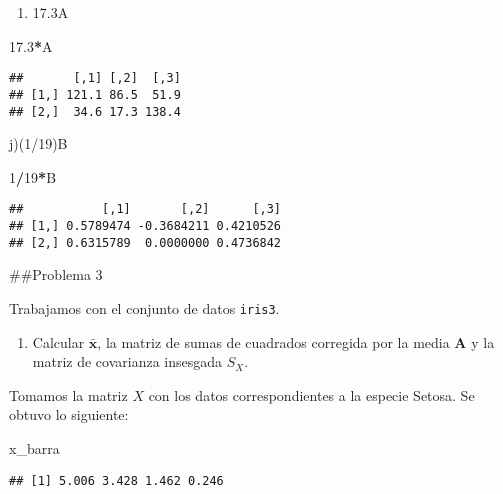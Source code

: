 \documentclass[
]{article}
\newenvironment{Shaded}{\begin{snugshade}}{\end{snugshade}}
\newcommand{\DecValTok}[1]{\textcolor[rgb]{0.00,0.00,0.81}{#1}}
\newcommand{\FloatTok}[1]{\textcolor[rgb]{0.00,0.00,0.81}{#1}}
\newcommand{\NormalTok}[1]{#1}
\newcommand{\OperatorTok}[1]{\textcolor[rgb]{0.81,0.36,0.00}{\textbf{#1}}}
\providecommand{\tightlist}{%
  \setlength{\itemsep}{0pt}\setlength{\parskip}{0pt}}
\begin{document}
\begin{enumerate}
\def\labelenumi{\roman{enumi})}
\tightlist
\item
  17.3A
\end{enumerate}

\begin{Shaded}
\begin{Highlighting}[]
\FloatTok{17.3}\OperatorTok{*}\NormalTok{A}
\end{Highlighting}
\end{Shaded}

\begin{verbatim}
##       [,1] [,2]  [,3]
## [1,] 121.1 86.5  51.9
## [2,]  34.6 17.3 138.4
\end{verbatim}

j)(1/19)B

\begin{Shaded}
\begin{Highlighting}[]
\DecValTok{1}\OperatorTok{/}\DecValTok{19}\OperatorTok{*}\NormalTok{B}
\end{Highlighting}
\end{Shaded}

\begin{verbatim}
##           [,1]       [,2]      [,3]
## [1,] 0.5789474 -0.3684211 0.4210526
## [2,] 0.6315789  0.0000000 0.4736842
\end{verbatim}

\#\#Problema 3

Trabajamos con el conjunto de datos \texttt{iris3}.

\begin{enumerate}
\def\labelenumi{\alph{enumi})}
\tightlist
\item
  Calcular \(\boldsymbol{\bar{x}}\), la matriz de sumas de cuadrados
  corregida por la media \(\boldsymbol{A}\) y la matriz de covarianza
  insesgada \(S_X\).
\end{enumerate}

Tomamos la matriz \(X\) con los datos correspondientes a la especie
Setosa. Se obtuvo lo siguiente:

\begin{Shaded}
\begin{Highlighting}[]
\NormalTok{x_barra}
\end{Highlighting}
\end{Shaded}

\begin{verbatim}
## [1] 5.006 3.428 1.462 0.246
\end{verbatim}
\end{document}
